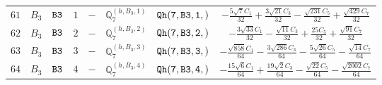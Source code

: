 \documentclass[fleqn,8pt]{jsarticle}
\begin{document}
\begin{table}[ht!]
\begin{center}
\begin{tabular}{cccccccc}
$ 61 $ & $ B_{3} $ & $ {\tt B3} $ & $ 1 $ & $ - $ & $ \mathbb{Q}_{7}^{(h,B_{3},1)} $ & $ {\tt Qh(7,B3,1,)} $ & $ - \frac{5 \sqrt{7} C_{1}}{32} + \frac{3 \sqrt{21} C_{3}}{32} - \frac{\sqrt{231} C_{5}}{32} + \frac{\sqrt{429} C_{7}}{32} $ \\
$ 62 $ & $ B_{3} $ & $ {\tt B3} $ & $ 2 $ & $ - $ & $ \mathbb{Q}_{7}^{(h,B_{3},2)} $ & $ {\tt Qh(7,B3,2,)} $ & $ - \frac{3 \sqrt{33} C_{1}}{32} - \frac{\sqrt{11} C_{3}}{32} + \frac{25 C_{5}}{32} + \frac{\sqrt{91} C_{7}}{32} $ \\
$ 63 $ & $ B_{3} $ & $ {\tt B3} $ & $ 3 $ & $ - $ & $ \mathbb{Q}_{7}^{(h,B_{3},3)} $ & $ {\tt Qh(7,B3,3,)} $ & $ - \frac{\sqrt{858} C_{1}}{64} - \frac{3 \sqrt{286} C_{3}}{64} - \frac{5 \sqrt{26} C_{5}}{64} - \frac{\sqrt{14} C_{7}}{64} $ \\
$ 64 $ & $ B_{3} $ & $ {\tt B3} $ & $ 4 $ & $ - $ & $ \mathbb{Q}_{7}^{(h,B_{3},4)} $ & $ {\tt Qh(7,B3,4,)} $ & $ - \frac{15 \sqrt{6} C_{1}}{64} + \frac{19 \sqrt{2} C_{3}}{64} - \frac{\sqrt{22} C_{5}}{64} - \frac{\sqrt{2002} C_{7}}{64} $ \\
 \hline \hline
\end{tabular}
\end{center}
\end{table}
\end{document}
